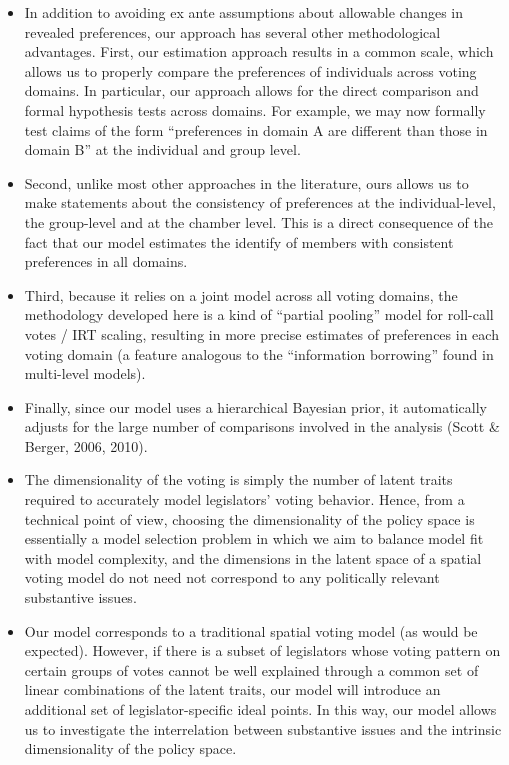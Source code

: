 \documentclass[a4paper,12pt]{article}
\begin{document}
\begin{enumerate}
\begin{itemize}
\item In addition to avoiding ex ante assumptions about allowable changes in revealed preferences, our approach has several other methodological advantages. First, our estimation approach results in a common scale, which allows us to properly compare the preferences of individuals across voting domains. In particular, our approach allows for the direct comparison and formal hypothesis tests across domains. For example, we may now formally test claims of the form “preferences in domain A are different than those in domain B” at the individual and group level.  
\item Second, unlike most other approaches in the literature, ours allows us to make statements about the consistency of preferences at the individual-level, the group-level and at the chamber level. This is a direct consequence of the fact that our model estimates the identify of members with consistent preferences in all domains.  
\item Third, because it relies on a joint model across all voting domains, the methodology developed here is a kind of “partial pooling” model for roll-call votes / IRT scaling, resulting in more precise estimates of preferences in each voting domain (a feature analogous to the “information borrowing” found in multi-level models).  
\item Finally, since our model uses a hierarchical Bayesian prior, it automatically adjusts for the large number of comparisons involved in the analysis (Scott \& Berger, 2006, 2010). 
\item The dimensionality of the voting is simply the number of latent traits required to accurately model legislators’ voting behavior. Hence, from a technical point of view, choosing the dimensionality of the policy space is essentially a model selection problem in which we aim to balance model fit with model complexity, and the dimensions in the latent space of a spatial voting model do not need not correspond to any politically relevant substantive issues. 
\item Our model corresponds to a traditional spatial voting model (as would be expected). However, if there is a subset of legislators whose voting pattern on certain groups of votes cannot be well explained through a common set of linear combinations of the latent traits, our model will introduce an additional set of legislator-specific ideal points. In this way, our model allows us to investigate the interrelation between substantive issues and the intrinsic dimensionality of the policy space. 

\end{itemize}
\end{enumerate}
\end{document}
